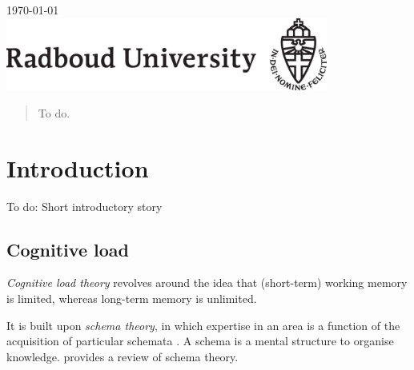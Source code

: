 \documentclass[11pt,leqno,a4paper]{report} %
\begin{document}
\begin{titlepage}

{\large \today}\\[3cm] %


\includegraphics[width=300pt]{radlogo}\\[1cm] %
 

\vfill %

\end{titlepage}


\tableofcontents 
{}

\begin{abstract}
To do.
\end{abstract}


\chapter{Introduction}

To do: Short introductory story

\section{Cognitive load}
\emph{Cognitive load theory} \citep{Sweller1994} revolves around the idea that (short-term) working memory is limited, whereas long-term memory is unlimited. 

It is built upon \emph{schema theory}, in which expertise in an area is a function of the acquisition of particular schemata \citep{bartlett1995remembering}. A schema is a mental structure to organise knowledge. \citep{mcvee2005schema} provides a review of schema theory.
\end{document}
